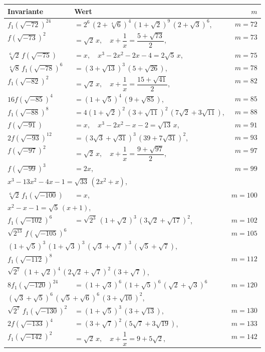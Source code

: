 \documentclass[12pt,a4paper]{article}
\begin{document}
\newpage
\setcounter{page}{724}

\begin{longtable}{@{}llr@{}}
\toprule
\multicolumn{1}{l}{\textbf{Invariante}} & \multicolumn{1}{l}{\textbf{Wert}} & $m$ \\
\midrule
\endhead
$f_1(\sqrt{-72})^{24}$ &$= 2^6\,(2+\sqrt[4]{6})^4\,(1+\sqrt{2})^9\,(2+\sqrt{3})^6$, & $m=72$ \\
$f(\sqrt{-73})^2$ &$= \sqrt{2}\,x,\quad x+\dfrac{1}{x}=\dfrac{5+\sqrt{73}}{2}$, & $m=73$ \\
$\sqrt[6]{2}\,f(\sqrt{-75})$ &$= x,\quad x^3-2x^2-2x-4=2\sqrt{5}\,x$, & $m=75$ \\
$\sqrt[4]{8}\,f_1(\sqrt{-78})^6$ &$= (3+\sqrt{13})^3\,(5+\sqrt{26})$, & $m=78$ \\
$f_1(\sqrt{-82})^2$ &$= \sqrt{2}\,x,\quad x+\dfrac{1}{x}=\dfrac{15+\sqrt{41}}{2}$, & $m=82$ \\
$16f(\sqrt{-85})^4$ &$= (1+\sqrt{5})^4\,(9+\sqrt{85})$, & $m=85$ \\
$f_1(\sqrt{-88})^8$ &$= 4(1+\sqrt{2})^2\,(3+\sqrt{11})^2\,(7\sqrt{2}+3\sqrt{11})$, & $m=88$ \\
$f(\sqrt{-91})$ &$= x,\quad x^3-2x^2-x-2=\sqrt{13}\,x$, & $m=91$ \\
$2f(\sqrt{-93})^{12}$ &$= (3\sqrt{3}+\sqrt{31})^3\,(39+7\sqrt{31})^2$, & $m=93$ \\
$f(\sqrt{-97})^2$ &$= \sqrt{2}\,x,\quad x+\dfrac{1}{x}=\dfrac{9+\sqrt{97}}{2}$, & $m=97$ \\
$f(\sqrt{-99})^3$ &$= 2x$, & $m=99$ \\
\multicolumn{3}{l}{\qquad$x^3-13x^2-4x-1=\sqrt{33}\,(2x^2+x)$,} \\
$\sqrt[6]{2}\,f_1(\sqrt{-100})$ &$= x$, & $m=100$ \\
\multicolumn{3}{l}{\qquad$x^2-x-1=\sqrt{5}\,(x+1)$,} \\
$f_1(\sqrt{-102})^6$ &$= \sqrt{2^3}\,(1+\sqrt{2})^3\,(3\sqrt{2}+\sqrt{17})^2$, & $m=102$ \\
$\sqrt{2^{13}}\,f(\sqrt{-105})^6$ & & $m=105$ \\
\multicolumn{3}{l}{\qquad$(1+\sqrt{5})^3\,(1+\sqrt{3})^3\,(\sqrt{3}+\sqrt{7})^3\,(\sqrt{5}+\sqrt{7})$,} \\
$f_1(\sqrt{-112})^8$ & & $m=112$ \\
\multicolumn{3}{l}{\qquad$\sqrt{2^7}\,(1+\sqrt{2})^4\,(2\sqrt{2}+\sqrt{7})^2\,(3+\sqrt{7})$,} \\
$8f_1(\sqrt{-120})^{24}$ &$= (1+\sqrt{3})^6\,(1+\sqrt{5})^6\,(\sqrt{2}+\sqrt{3})^6$ & $m=120$ \\
\multicolumn{3}{l}{\qquad$(\sqrt{3}+\sqrt{5})^6\,(\sqrt{5}+\sqrt{6})^6\,(3+\sqrt{10})^2$,} \\
$\sqrt{2^7}\,f_1(\sqrt{-130})^2$ &$= (1+\sqrt{5})^3\,(3+\sqrt{13})$, & $m=130$ \\
$2f(\sqrt{-133})^4$ &$= (3+\sqrt{7})^2\,(5\sqrt{7}+3\sqrt{19})$, & $m=133$ \\
$f_1(\sqrt{-142})^2$ &$= \sqrt{2}\,x,\quad x+\dfrac{1}{x}=9+5\sqrt{2}$, & $m=142$ \\
\bottomrule
\end{longtable}
\end{document}
